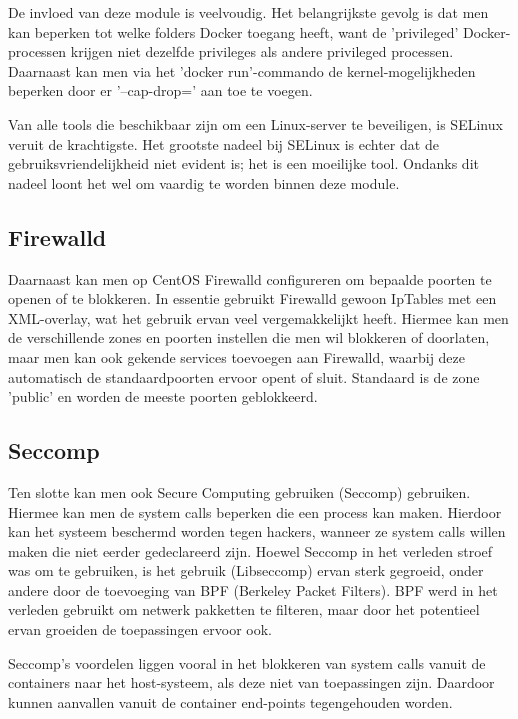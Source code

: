 De invloed van deze module is veelvoudig. Het belangrijkste gevolg is dat men kan beperken tot welke folders Docker toegang heeft, want de 'privileged' Docker-processen krijgen niet dezelfde privileges als andere privileged processen. Daarnaast kan men via het 'docker run'-commando de kernel-mogelijkheden beperken door er '--cap-drop=' aan toe te voegen.

Van alle tools die beschikbaar zijn om een Linux-server te beveiligen, is SELinux veruit de krachtigste. Het grootste nadeel bij SELinux is echter dat de gebruiksvriendelijkheid niet evident is; het is een moeilijke tool. Ondanks dit nadeel loont het wel om vaardig te worden binnen deze module. \autocite{Henry-Stocker2012} \autocite{Juggery2017} \autocite{Walsh2013}

\subsection{Firewalld}
Daarnaast kan men op CentOS Firewalld configureren om bepaalde poorten te openen of te blokkeren. In essentie gebruikt Firewalld gewoon IpTables met een XML-overlay, wat het gebruik ervan veel vergemakkelijkt heeft. Hiermee kan men de verschillende zones en poorten instellen die men wil blokkeren of doorlaten, maar men kan ook gekende services toevoegen aan Firewalld, waarbij deze automatisch de standaardpoorten ervoor opent of sluit. Standaard is de zone 'public' en worden de meeste poorten geblokkeerd. \autocite{Brown2014} 

\subsection{Seccomp}
Ten slotte kan men ook Secure Computing gebruiken (Seccomp) gebruiken. Hiermee kan men de system calls beperken die een process kan maken. Hierdoor kan het systeem beschermd worden tegen hackers, wanneer ze system calls willen maken die niet eerder gedeclareerd zijn. Hoewel Seccomp in het verleden stroef was om te gebruiken, is het gebruik (Libseccomp) ervan sterk gegroeid, onder andere door de toevoeging van BPF (Berkeley Packet Filters). BPF werd in het verleden gebruikt om netwerk pakketten te filteren, maar door het potentieel ervan groeiden de toepassingen ervoor ook.

Seccomp's voordelen liggen vooral in het blokkeren van system calls vanuit de containers naar het host-systeem, als deze niet van toepassingen zijn. Daardoor kunnen aanvallen vanuit de container end-points tegengehouden worden. \autocite{Arora2012} \autocite{Spijkers2013}

